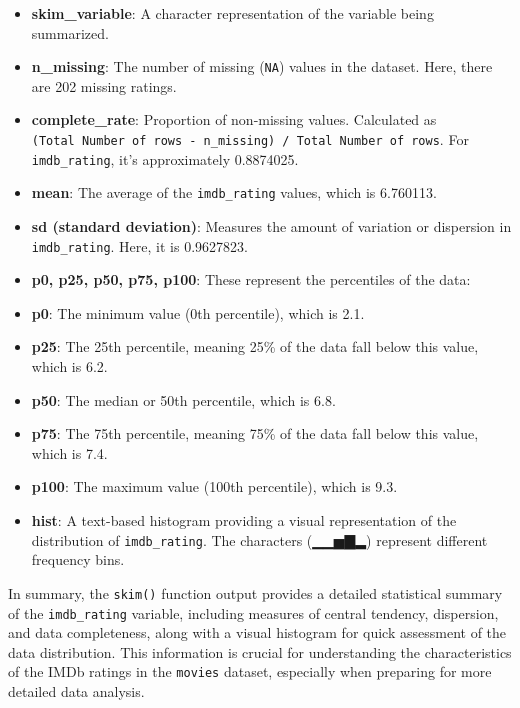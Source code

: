 \documentclass[
]{book}
\providecommand{\tightlist}{%
  \setlength{\itemsep}{0pt}\setlength{\parskip}{0pt}}
\begin{document}
\begin{enumerate}
  \begin{itemize}
  \tightlist
  \item
    \textbf{skim\_variable}: A character representation of the variable being summarized.
  \item
    \textbf{n\_missing}: The number of missing (\texttt{NA}) values in the dataset. Here, there are 202 missing ratings.
  \item
    \textbf{complete\_rate}: Proportion of non-missing values. Calculated as \texttt{(Total\ Number\ of\ rows\ -\ n\_missing)\ /\ Total\ Number\ of\ rows}. For \texttt{imdb\_rating}, it's approximately 0.8874025.
  \item
    \textbf{mean}: The average of the \texttt{imdb\_rating} values, which is 6.760113.
  \item
    \textbf{sd (standard deviation)}: Measures the amount of variation or dispersion in \texttt{imdb\_rating}. Here, it is 0.9627823.
  \item
    \textbf{p0, p25, p50, p75, p100}: These represent the percentiles of the data:
  \item
    \textbf{p0}: The minimum value (0th percentile), which is 2.1.
  \item
    \textbf{p25}: The 25th percentile, meaning 25\% of the data fall below this value, which is 6.2.
  \item
    \textbf{p50}: The median or 50th percentile, which is 6.8.
  \item
    \textbf{p75}: The 75th percentile, meaning 75\% of the data fall below this value, which is 7.4.
  \item
    \textbf{p100}: The maximum value (100th percentile), which is 9.3.
  \item
    \textbf{hist}: A text-based histogram providing a visual representation of the distribution of \texttt{imdb\_rating}. The characters (▁▁▅▇▂) represent different frequency bins.
  \end{itemize}
\end{enumerate}

In summary, the \texttt{skim()} function output provides a detailed statistical summary of the \texttt{imdb\_rating} variable, including measures of central tendency, dispersion, and data completeness, along with a visual histogram for quick assessment of the data distribution. This information is crucial for understanding the characteristics of the IMDb ratings in the \texttt{movies} dataset, especially when preparing for more detailed data analysis.
\end{document}
